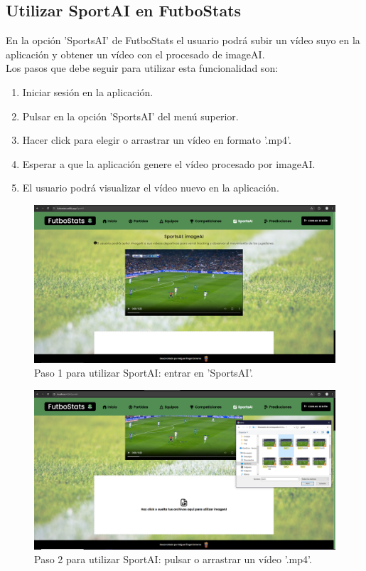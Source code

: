 \subsection{Utilizar SportAI en FutboStats}
En la opción 'SportsAI' de FutboStats el usuario podrá subir un vídeo suyo en la aplicación y obtener un vídeo con el procesado de imageAI. \\
Los pasos que debe seguir para utilizar esta funcionalidad son:
\begin{enumerate}
    \item Iniciar sesión en la aplicación.
    \item Pulsar en la opción 'SportsAI' del menú superior.
    \item Hacer click para elegir o arrastrar un vídeo en formato '.mp4'.
    \item Esperar a que la aplicación genere el vídeo procesado por imageAI.
    \item El usuario podrá visualizar el vídeo nuevo en la aplicación.
\end{enumerate}

\begin{figure}[H]
    \centering
    \includegraphics[width=1\linewidth]{img/sportsAI-UM.png}
    \caption{Paso 1 para utilizar SportAI: entrar en 'SportsAI'.}
    \label{fig:enter-label}
\end{figure}

\begin{figure}[H]
    \centering
    \includegraphics[width=1\linewidth]{img/sportsAI2-UM.png}
    \caption{Paso 2 para utilizar SportAI: pulsar o arrastrar un vídeo '.mp4'.}
    \label{fig:enter-label}
\end{figure}

